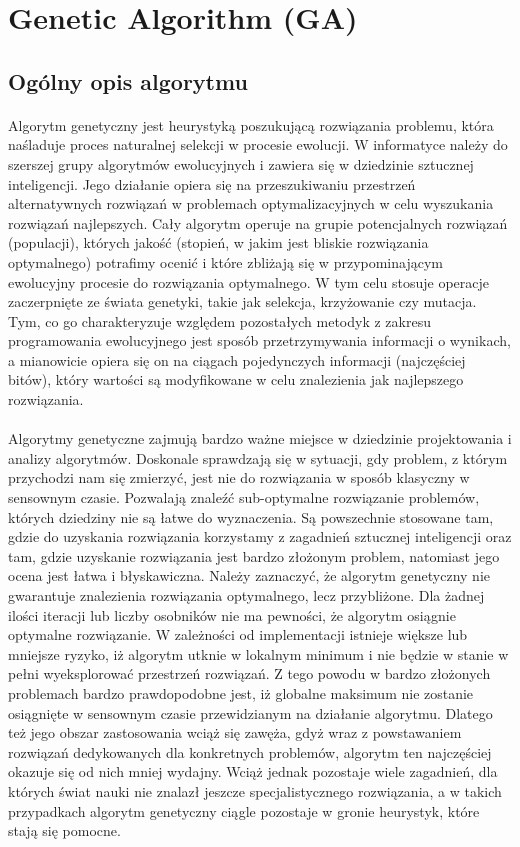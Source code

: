 \section{Genetic Algorithm (GA)}
\author{Filip Czajkowski}
\subsection{Ogólny opis algorytmu}
\paragraph{}Algorytm genetyczny jest heurystyką poszukującą rozwiązania problemu, która naśladuje proces naturalnej selekcji w procesie ewolucji. W informatyce należy do szerszej grupy algorytmów ewolucyjnych i zawiera się w dziedzinie sztucznej inteligencji. Jego działanie opiera się na przeszukiwaniu przestrzeń alternatywnych rozwiązań w problemach optymalizacyjnych w celu wyszukania rozwiązań najlepszych. Cały algorytm operuje na grupie potencjalnych rozwiązań (populacji), których jakość (stopień, w jakim jest bliskie rozwiązania optymalnego) potrafimy ocenić i które zbliżają się w przypominającym ewolucyjny procesie do rozwiązania optymalnego. W tym celu stosuje operacje zaczerpnięte ze świata genetyki, takie jak selekcja, krzyżowanie czy mutacja. Tym, co go charakteryzuje względem pozostałych metodyk z zakresu programowania ewolucyjnego jest sposób przetrzymywania informacji o wynikach, a mianowicie opiera się on na ciągach pojedynczych informacji (najczęściej bitów), który wartości są modyfikowane w celu znalezienia jak najlepszego rozwiązania.
\paragraph{}Algorytmy genetyczne zajmują bardzo ważne miejsce w dziedzinie projektowania i analizy algorytmów. Doskonale sprawdzają się w sytuacji, gdy problem, z którym przychodzi nam się zmierzyć, jest nie do rozwiązania w sposób klasyczny w sensownym czasie. Pozwalają znaleźć sub-optymalne rozwiązanie problemów, których dziedziny nie są łatwe do wyznaczenia. Są powszechnie stosowane tam, gdzie do uzyskania rozwiązania korzystamy z zagadnień sztucznej inteligencji oraz tam, gdzie uzyskanie rozwiązania jest bardzo złożonym problem, natomiast jego ocena jest łatwa i błyskawiczna. Należy zaznaczyć, że algorytm genetyczny nie gwarantuje znalezienia rozwiązania optymalnego, lecz przybliżone. Dla żadnej ilości iteracji lub liczby osobników nie ma pewności, że algorytm osiągnie optymalne rozwiązanie. W zależności od implementacji istnieje większe lub mniejsze ryzyko, iż algorytm utknie w lokalnym minimum i nie będzie w stanie w pełni wyeksplorować przestrzeń rozwiązań. Z tego powodu w bardzo złożonych problemach bardzo prawdopodobne jest, iż globalne maksimum nie zostanie osiągnięte w sensownym czasie przewidzianym na działanie algorytmu. Dlatego też jego obszar zastosowania wciąż się zawęża, gdyż wraz z powstawaniem rozwiązań dedykowanych dla konkretnych problemów, algorytm ten najczęściej okazuje się od nich mniej wydajny. Wciąż jednak pozostaje wiele zagadnień, dla których świat nauki nie znalazł jeszcze specjalistycznego rozwiązania, a w takich przypadkach algorytm genetyczny ciągle pozostaje w gronie heurystyk, które stają się pomocne.
